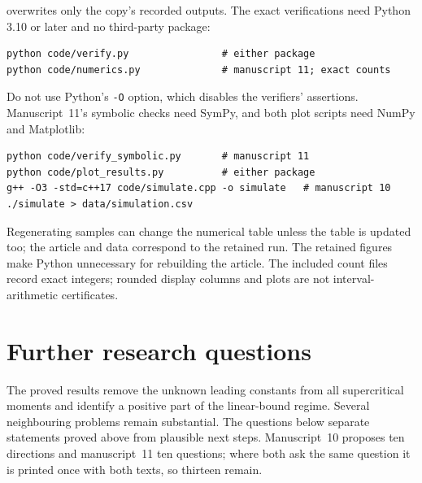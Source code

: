 \documentclass[11pt,a4paper]{article}
\theoremstyle{definition}\newaliascnt{definition}{theorem}
\theoremstyle{remark}\newaliascnt{remark}{theorem}
\begin{document}
overwrites only the copy's recorded outputs. The exact verifications need
Python 3.10 or later and no third-party package:
\begin{verbatim}
python code/verify.py                # either package
python code/numerics.py              # manuscript 11; exact counts
\end{verbatim}
Do not use Python's \texttt{-O} option, which disables the verifiers'
assertions. Manuscript~11's symbolic checks need SymPy, and both plot scripts
need NumPy and Matplotlib:
\begin{verbatim}
python code/verify_symbolic.py       # manuscript 11
python code/plot_results.py          # either package
g++ -O3 -std=c++17 code/simulate.cpp -o simulate   # manuscript 10
./simulate > data/simulation.csv
\end{verbatim}
Regenerating samples can change the numerical table unless the table is
updated too; the article and data correspond to the retained run. The
retained figures make Python unnecessary for rebuilding the article. The
included count files record exact integers; rounded display columns and plots
are not interval-arithmetic certificates.

\section{Further research questions}
\label{mj:sec:questions}
The proved results remove the unknown leading constants from all
supercritical moments and identify a positive part of the linear-bound
regime. Several neighbouring problems remain substantial. The questions below
separate statements proved above from plausible next steps. Manuscript~10
proposes ten directions and manuscript~11 ten questions; where both ask the
same question it is printed once with both texts, so thirteen remain.
\end{document}
